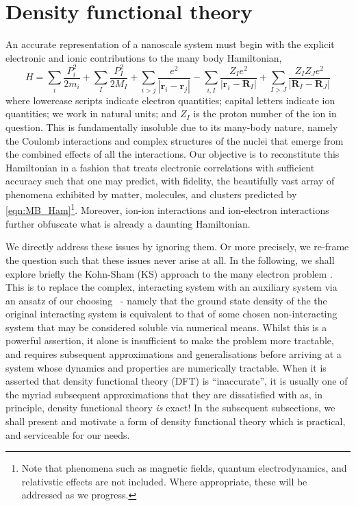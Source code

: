 \section{Density functional theory}
\label{sec:Theory_DFT}
An accurate representation of a nanoscale system must begin with the explicit electronic and ionic contributions to the many body Hamiltonian,
\begin{equation}
    H = \sum_{i} \frac{ P_{i}^{2} }{2m_{i}} + \sum_{I} \frac{ P_{I}^{2} }{2M_{I}} + \sum_{i>j} \frac{e^{2}}{ |\textbf{r}_{i} - \textbf{r}_{j}| } - \sum_{i,I} \frac{ Z_{I} e^{2} }{ | \textbf{r}_{i} - \textbf{R}_{I} |} + \sum_{I>J} \frac{ Z_{I}Z_{J}e^{2}}{ | \textbf{R}_{I} - \textbf{R}_{J} | }
    \label{eqn:MB_Ham}
\end{equation}
where lowercase scripts indicate electron quantities; capital letters indicate ion quantities; we work in natural units; and $Z_{I}$ is the proton number of the ion in question. This is fundamentally insoluble due to its many-body nature, namely the Coulomb interactions and complex structures of the nuclei that emerge from the combined effects of all the interactions. Our objective is to reconstitute this Hamiltonian in a fashion that treats electronic correlations with sufficient accuracy such that one may predict, with fidelity, the beautifully vast array of phenomena exhibited by matter, molecules, and clusters predicted by \ref{eqn:MB_Ham}\footnote{Note that phenomena such as magnetic fields, quantum electrodynamics, and relativstic effects are not included. Where appropriate, these will be addressed as we progress.}. Moreover, ion-ion interactions and ion-electron interactions further obfuscate what is already a daunting Hamiltonian. 

We directly address these issues by ignoring them. Or more precisely, we re-frame the question such that these issues never arise at all. In the following, we shall explore briefly the Kohn-Sham (KS) approach to the many electron problem \cite{KS}. This is to replace the complex, interacting system with an auxiliary system via an ansatz of our choosing ~- namely that the ground state density of the the original interacting system is equivalent to that of some chosen non-interacting system that may be considered soluble via numerical means. Whilst this is a powerful assertion, it alone is insufficient to make the problem more tractable, and requires subsequent approximations and generalisations before arriving at a system whose dynamics and properties are numerically tractable. When it is asserted that density functional theory (DFT) is ``inaccurate'', it is usually one of the myriad subsequent approximations that they are dissatisfied with as, in principle, density functional theory \textit{is} exact! In the subsequent subsections, we shall present and motivate a form of density functional theory which is practical, and serviceable for our needs.

